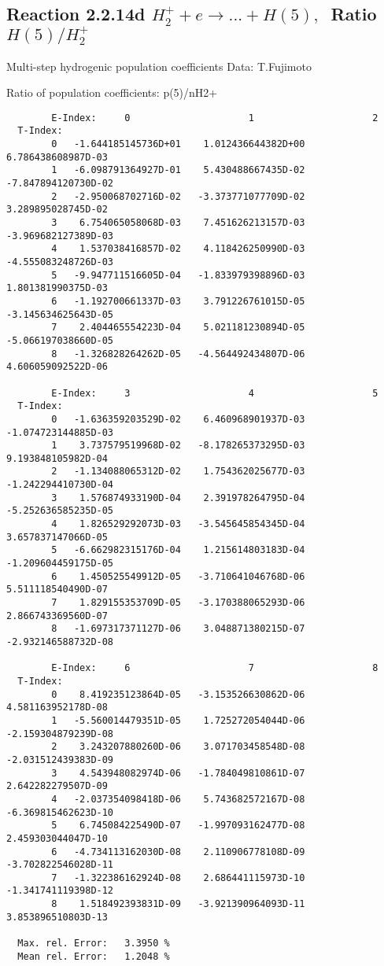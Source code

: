\documentclass[12pt]{article}
\begin{document}
\subsection{
Reaction 2.2.14d $ H_2^+ + e \rightarrow ...+ H(5) , \   $
Ratio $H(5)/H_2^+  $
}

 Multi-step hydrogenic population coefficients
 Data: T.Fujimoto

 Ratio of population coefficients: p(5)/nH2+

\begin{small}\begin{verbatim}
        E-Index:     0                     1                     2
  T-Index:
        0   -1.644185145736D+01    1.012436644382D+00    6.786438608987D-03
        1   -6.098791364927D-01    5.430488667435D-02   -7.847894120730D-02
        2   -2.950068702716D-02   -3.373771077709D-02    3.289895028745D-02
        3    6.754065058068D-03    7.451626213157D-03   -3.969682127389D-03
        4    1.537038416857D-02    4.118426250990D-03   -4.555083248726D-03
        5   -9.947711516605D-04   -1.833979398896D-03    1.801381990375D-03
        6   -1.192700661337D-03    3.791226761015D-05   -3.145634625643D-05
        7    2.404465554223D-04    5.021181230894D-05   -5.066197038660D-05
        8   -1.326828264262D-05   -4.564492434807D-06    4.606059092522D-06

        E-Index:     3                     4                     5
  T-Index:
        0   -1.636359203529D-02    6.460968901937D-03   -1.074723144885D-03
        1    3.737579519968D-02   -8.178265373295D-03    9.193848105982D-04
        2   -1.134088065312D-02    1.754362025677D-03   -1.242294410730D-04
        3    1.576874933190D-04    2.391978264795D-04   -5.252636585235D-05
        4    1.826529292073D-03   -3.545645854345D-04    3.657837147066D-05
        5   -6.662982315176D-04    1.215614803183D-04   -1.209604459175D-05
        6    1.450525549912D-05   -3.710641046768D-06    5.511118540490D-07
        7    1.829155353709D-05   -3.170388065293D-06    2.866743369560D-07
        8   -1.697317371127D-06    3.048871380215D-07   -2.932146588732D-08

        E-Index:     6                     7                     8
  T-Index:
        0    8.419235123864D-05   -3.153526630862D-06    4.581163952178D-08
        1   -5.560014479351D-05    1.725272054044D-06   -2.159304879239D-08
        2    3.243207880260D-06    3.071703458548D-08   -2.031512439383D-09
        3    4.543948082974D-06   -1.784049810861D-07    2.642282279507D-09
        4   -2.037354098418D-06    5.743682572167D-08   -6.369815462623D-10
        5    6.745084225490D-07   -1.997093162477D-08    2.459303044047D-10
        6   -4.734113162030D-08    2.110906778108D-09   -3.702822546028D-11
        7   -1.322386162924D-08    2.686441115973D-10   -1.341741119398D-12
        8    1.518492393831D-09   -3.921390964093D-11    3.853896510803D-13

  Max. rel. Error:   3.3950 %
  Mean rel. Error:   1.2048 %

\end{verbatim}\end{small}
\end{document}
